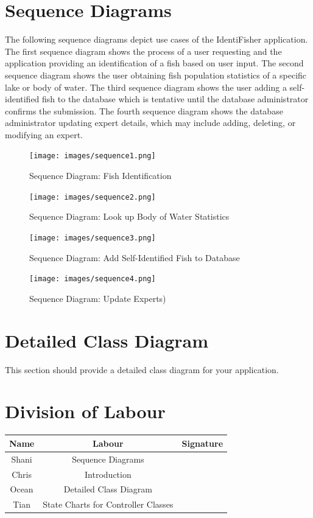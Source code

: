 \documentclass[]{article}
\begin{document}
\section{Sequence Diagrams}
\label{sec:sequence_diagrams}
The following sequence diagrams depict use cases of the IdentiFisher application. The first sequence diagram shows the process of a user requesting and the application providing an identification of a fish based on user input. The second sequence diagram shows the user obtaining fish population statistics of a specific lake or body of water. The third sequence diagram shows the user adding a self-identified fish to the database which is tentative until the database administrator confirms the submission. The fourth sequence diagram shows the database administrator updating expert details, which may include adding, deleting, or modifying an expert.
\begin{figure}[H]
	\texttt{[image: images/sequence1.png]}
	\caption{Sequence Diagram: Fish Identification}
\end{figure}
\begin{figure}[H]
	\texttt{[image: images/sequence2.png]}
	\caption{Sequence Diagram: Look up Body of Water Statistics}
\end{figure}
\begin{figure}[H]
	\texttt{[image: images/sequence3.png]}
	\caption{Sequence Diagram: Add Self-Identified Fish to Database}
\end{figure}
\begin{figure}[H]
	\texttt{[image: images/sequence4.png]}
	\caption{Sequence Diagram: Update Experts)}
\end{figure}

\section{Detailed Class Diagram}
\label{sec:detailed_class_diagram}
This section should provide a detailed class diagram for your application.

\vfill
\listoffigures

\appendix
\section{Division of Labour}
\label{sec:division_of_labour}
\begin{center}
\begin{tabular}{ |c|c|c| }
 \hline
 Name & Labour & Signature \\ \hline
 Shani & Sequence Diagrams & \\
 Chris & Introduction  &  \\
 Ocean &  Detailed Class Diagram &  \\
 Tian & State Charts for Controller Classes & \\
 \hline
\end{tabular}
\end{center}
\end{document}
